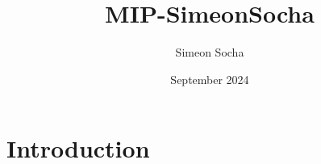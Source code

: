 \documentclass{article}
\title{MIP-SimeonSocha}
\author{Simeon Socha}
\date{September 2024}
\begin{document}
\maketitle

\section{Introduction}
\end{document}
